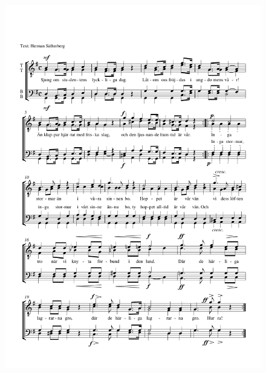 \documentclass[a6paper,11pt]{article}
\begin{document}
\setlength{\oddsidemargin}{-0.47in}
\begin{center}
\end{center}
\vspace{-40pt}
\begin{figure}[!h]
\centering
\includegraphics[width=\textwidth]{studentsangen}
\end{figure}
\end{document}
